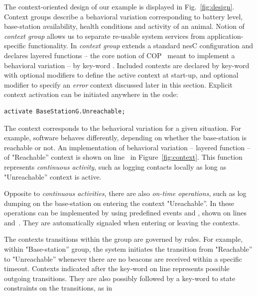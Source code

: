 The context-oriented design of our example is displayed in
Fig.~\ref{fig:design}. Context groups describe a behavioral variation
corresponding to battery level, base-station availability, health conditions and
activity of an animal. Notion of \emph{context group} allows us to separate
re-usable system services from application-specific functionality. In \conesc
\emph{context group} extends a standard nesC configuration and declares layered
functions -- the core notion of COP~\cite{Hirschfeld08} meant to implement a
behavioral variation -- by key-word . Included contexts are
declared by key-word  with optional modifiers 
to define the active context at start-up, and optional modifier 
to specify an \emph{error} context discussed later in this section. Explicit
context activation can be initiated anywhere in the code:

\vspace{-1mm}
\begin{lstlisting}[language=conesc]
activate BaseStationG.Unreachable;
\end{lstlisting}
\vspace{-1.5mm}

The context corresponds to the behavioral variation for a given situation. For
example, software behaves differently, depending on whether the base-station is
reachable or not. An implementation of behavioral variation -- layered function
-- of "Reachable'' context is shown on line~ in
Figure~\ref{fig:context}. This function represents \emph{continuous activity},
such as logging contacts locally as long as "Unreachable'' context is active.

Opposite to \emph{continuous activities}, there are also \emph{on-time
operations}, such as log dumping on the base-station on entering the context
"Ureachable''. In \conesc these operations can be implemented by using
predefined events  and , shown on
lines~ and~. They are automatically
signaled when entering or leaving the contexts.

The contexts transitions within the group are governed by rules. For example,
within "Base-station'' group, the system initiates the transition from
"Reachable'' to "Unreachable'' whenever there are no beacons are received within
a specific timeout. Contexts indicated after the key-word  on
line  represents possible outgoing transitions. They are also
possibly followed by a key-word  to state constraints on the
transitions, as in

